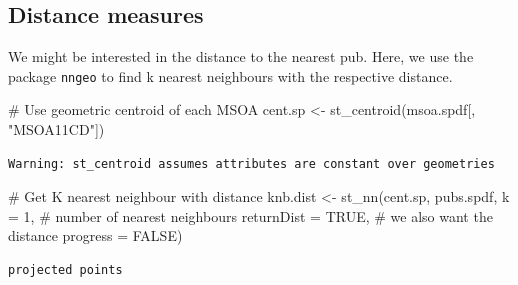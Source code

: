 \documentclass[
  letterpaper,
]{scrbook}
\newenvironment{Shaded}{\begin{snugshade}}{\end{snugshade}}
\newcommand{\AttributeTok}[1]{\textcolor[rgb]{0.40,0.45,0.13}{#1}}
\newcommand{\CommentTok}[1]{\textcolor[rgb]{0.37,0.37,0.37}{#1}}
\newcommand{\ConstantTok}[1]{\textcolor[rgb]{0.56,0.35,0.01}{#1}}
\newcommand{\DecValTok}[1]{\textcolor[rgb]{0.68,0.00,0.00}{#1}}
\newcommand{\FunctionTok}[1]{\textcolor[rgb]{0.28,0.35,0.67}{#1}}
\newcommand{\NormalTok}[1]{\textcolor[rgb]{0.00,0.23,0.31}{#1}}
\newcommand{\OtherTok}[1]{\textcolor[rgb]{0.00,0.23,0.31}{#1}}
\newcommand{\SpecialCharTok}[1]{\textcolor[rgb]{0.37,0.37,0.37}{#1}}
\newcommand{\StringTok}[1]{\textcolor[rgb]{0.13,0.47,0.30}{#1}}
\begin{document}
\hypertarget{distance-measures}{%
\subsection{Distance measures}\label{distance-measures}}

We might be interested in the distance to the nearest pub. Here, we use
the package \texttt{nngeo} to find k nearest neighbours with the
respective distance.

\begin{Shaded}
\begin{Highlighting}[]
\CommentTok{\# Use geometric centroid of each MSOA}
\NormalTok{cent.sp }\OtherTok{\textless{}{-}} \FunctionTok{st\_centroid}\NormalTok{(msoa.spdf[, }\StringTok{"MSOA11CD"}\NormalTok{])}
\end{Highlighting}
\end{Shaded}

\begin{verbatim}
Warning: st_centroid assumes attributes are constant over geometries
\end{verbatim}

\begin{Shaded}
\begin{Highlighting}[]
\CommentTok{\# Get K nearest neighbour with distance}
\NormalTok{knb.dist }\OtherTok{\textless{}{-}} \FunctionTok{st\_nn}\NormalTok{(cent.sp, }
\NormalTok{                  pubs.spdf,}
                  \AttributeTok{k =} \DecValTok{1}\NormalTok{,             }\CommentTok{\# number of nearest neighbours}
                  \AttributeTok{returnDist =} \ConstantTok{TRUE}\NormalTok{, }\CommentTok{\# we also want the distance}
                  \AttributeTok{progress =} \ConstantTok{FALSE}\NormalTok{)}
\end{Highlighting}
\end{Shaded}

\begin{verbatim}
projected points
\end{verbatim}

\begin{Shaded}
\end{Shaded}
\end{document}
